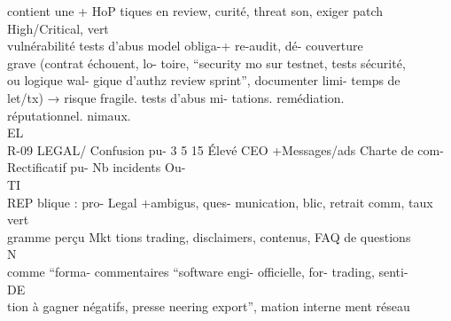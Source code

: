 contient      une              + HoP tiques en review, curité,      threat son, exiger patch High/Critical, vert\\
vulnérabilité                          tests     d’abus model      obliga-+ re-audit, dé- couverture\\
grave    (contrat                      échouent,     lo- toire, “security mo sur testnet, tests sécurité,\\
ou logique wal-                        gique    d’authz review sprint”, documenter limi- temps            de\\
let/tx) → risque                       fragile.          tests d’abus mi- tations.             remédiation.\\
réputationnel.                                           nimaux.\\
\vspace{0.5em}
\vspace{0.5em}
\vspace{0.5em}
\vspace{0.5em}
EL\\
R-09       LEGAL/   Confusion      pu- 3 5 15 Élevé CEO +Messages/ads        Charte de com- Rectificatif pu- Nb incidents Ou-\\
\vspace{0.5em}
\vspace{0.5em}
\vspace{0.5em}
\vspace{0.5em}
TI\\
REP      blique   :    pro-              Legal +ambigus, ques- munication,         blic,     retrait comm, taux vert\\
gramme      perçu               Mkt    tions    trading, disclaimers,     contenus, FAQ de questions\\
\vspace{0.5em}
\vspace{0.5em}
\vspace{0.5em}
\vspace{0.5em}
N\\
comme “forma-                          commentaires “software engi- officielle,         for- trading, senti-\\
\vspace{0.5em}
\vspace{0.5em}
\vspace{0.5em}
\vspace{0.5em}
DE\\
tion à gagner                          négatifs, presse neering export”, mation interne ment réseau\\
